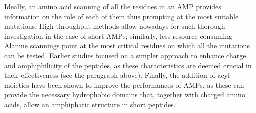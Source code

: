 \documentclass[a4paper,11pt]{extreport}
\begin{document}
Ideally, an amino acid scanning of all the residues in an AMP provides information on the role of each of them thus prompting at the most suitable mutations. High-throughput methods allow nowadays for such thorough investigation in the case of short AMPs;\cite{Hlpert2005,Hilpert2006}
similarly, less resource consuming Alanine scannings point at the most critical residues on which all the mutations can be tested.\cite{doi.org/10.1007/s12602-018-9501-0,doi: 10.1002/psc.1350,doi.org/10.1007/s00726-018-2625-4}
Earlier studies focused on a simpler approach to enhance charge and amphiphilicity of the peptides, as these characteristics are deemed crucial in their effectiveness (see the paragraph above).\cite{Wiradharma2011,Huang2010,Pag2008,Wang2015}
Finally, the addition of acyl moieties have been shown to improve the performances of AMPs, as these can provide the necessary hydrophobic domains that, together with charged amino acids, allow an amphiphatic structure in short pep­tides.\cite{Radzishevsky2005,Serrano2009,Avrahami2004}
\end{document}
